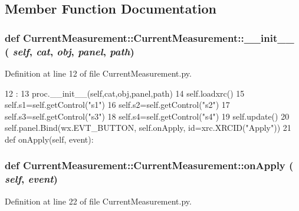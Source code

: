\subsection{Member Function Documentation}
\hypertarget{classCurrentMeasurement_1_1CurrentMeasurement_a8d86e531d513ee677b94705b0463e50c}{
\subsubsection[{\_\-\_\-init\_\-\_\-}]{\setlength{\rightskip}{0pt plus 5cm}def CurrentMeasurement::CurrentMeasurement::\_\-\_\-init\_\-\_\- ( {\em self}, \/   {\em cat}, \/   {\em obj}, \/   {\em panel}, \/   {\em path})}}
\label{classCurrentMeasurement_1_1CurrentMeasurement_a8d86e531d513ee677b94705b0463e50c}


Definition at line 12 of file CurrentMeasurement.py.


\begin{DoxyCode}
12                                              :
13         proc.__init__(self,cat,obj,panel,path)
14         self.loadxrc()
15         self.s1=self.getControl("s1")
16         self.s2=self.getControl("s2")
17         self.s3=self.getControl("s3")
18         self.s4=self.getControl("s4")
19         self.update()
20         self.panel.Bind(wx.EVT_BUTTON, self.onApply, id=xrc.XRCID("Apply"))
21 
    def onApply(self, event):
\end{DoxyCode}
\hypertarget{classCurrentMeasurement_1_1CurrentMeasurement_a9e6507d2178348375ccd74ad1cf31cae}{
\subsubsection[{onApply}]{\setlength{\rightskip}{0pt plus 5cm}def CurrentMeasurement::CurrentMeasurement::onApply ( {\em self}, \/   {\em event})}}
\label{classCurrentMeasurement_1_1CurrentMeasurement_a9e6507d2178348375ccd74ad1cf31cae}


Definition at line 22 of file CurrentMeasurement.py.


